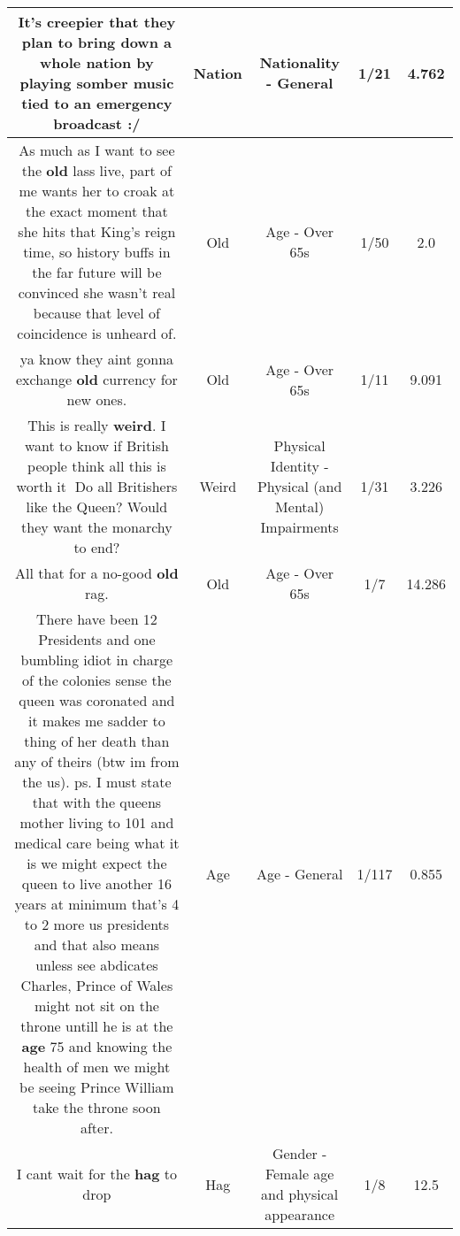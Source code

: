 \documentclass[11pt]{article}
\newlength\mylength
\begin{document}
\begin{center}
\begin{longtable}{|C{.65\mylength}|C{.30\mylength}|C{.12\mylength}|C{.12\mylength}|C{.12\mylength}|}
  \small It's creepier that they plan to bring down a whole \textbf{nation} by playing somber music tied to an emergency broadcast :/\normalsize   & Nation & Nationality - General & 1/21 & 4.762 \\  \hline
  \small As much as I want to see the \textbf{old} lass live, part of me wants her to croak at the exact moment that she hits that King's reign time, so history buffs in the far future will be convinced she wasn't real because that level of coincidence is unheard of.\normalsize   & Old & Age - Over 65s & 1/50 & 2.0 \\  \hline
  \small ya know they aint gonna exchange \textbf{old} currency for new ones.\normalsize   & Old & Age - Over 65s & 1/11 & 9.091 \\  \hline
  \small This is really \textbf{weird}. I want to know if British people think all this is worth it 🤔Do all Britishers like the Queen? Would they want the monarchy to end?\normalsize   & Weird & Physical Identity - Physical (and Mental) Impairments & 1/31 & 3.226 \\  \hline
  \small All that for a no-good \textbf{old} rag.\normalsize   & Old & Age - Over 65s & 1/7 & 14.286 \\  \hline
  \small There have been 12 Presidents and one bumbling idiot  in charge of the colonies sense the queen was coronated  and it makes me sadder to thing of her death than any of theirs (btw im from the us). ps. I must state that with the queens mother living to 101 and medical care being what it is we might expect the queen to live another 16 years at minimum that's 4 to 2 more us presidents and that also means unless see abdicates Charles, Prince of Wales might not sit on the throne untill he is at the \textbf{age} 75 and knowing the health of men  we might be seeing Prince William take the throne soon after.\normalsize   & Age & Age - General & 1/117 & 0.855 \\  \hline
  \small I cant wait for the \textbf{hag} to drop\normalsize   & Hag & Gender - Female age and physical appearance & 1/8 & 12.5 \\  \hline

\end{longtable}
\end{center}
\end{document}

